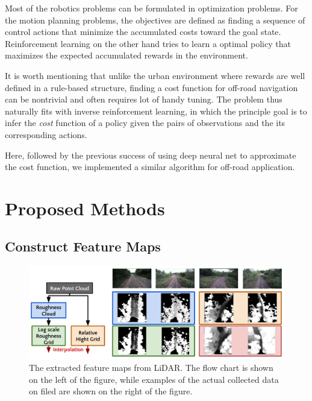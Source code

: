 \documentclass[../thesis.tex]{subfiles}
\begin{document}

Most of the robotics problems can be formulated in optimization problems. For the motion planning problems, the objectives are defined as finding a sequence of control actions that minimize the accumulated costs toward the goal state. Reinforcement learning on the other hand tries to learn a optimal policy that maximizes the expected accumulated rewards in the environment. 

It is worth mentioning that unlike the urban environment where rewards are well defined in a rule-based structure, finding a cost function for off-road navigation can be nontrivial and often requires lot of handy tuning. 
The problem thus naturally fits with inverse reinforcement learning, in which the principle goal is to infer the \textit{cost} function of a policy given the pairs of observations and the its corresponding actions.

Here, followed by the previous success \cite{wulfmeier2015maximum,wulfmeier2016watch} of using deep neural net to approximate the cost function, we implemented a similar algorithm for off-road application. 

\section{Proposed Methods}

\subsection{Construct Feature Maps}

\begin{figure}[t]
	\begin{center}
		\centerline{\includegraphics[width=\columnwidth]{./DIRL/fig/lidar_feature_map.png}}
		\caption{The extracted feature maps from LiDAR. The flow chart is shown on the left of the figure, while examples of the actual collected data on filed are shown on the right of the figure.}
		\label{fig:lidar_feature_map}
	\end{center}
\end{figure} 
\end{document}
